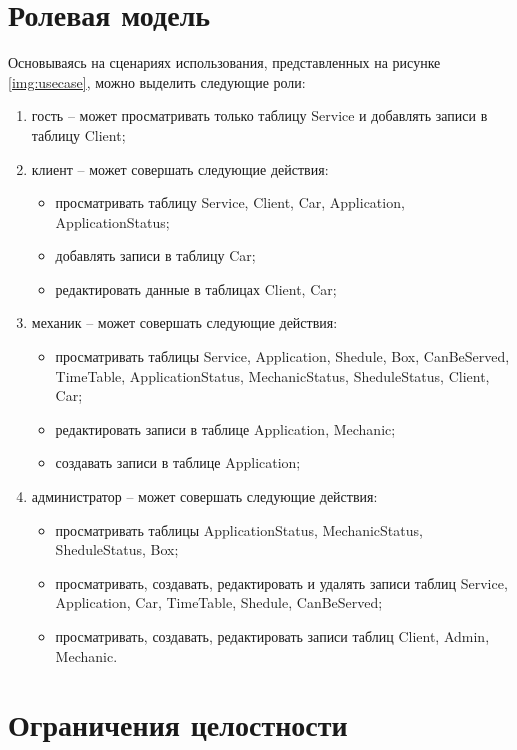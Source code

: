 \section{Ролевая модель}

Основываясь на сценариях использования, представленных на рисунке \ref{img:usecase}, можно выделить следующие роли:

\begin{enumerate}
	\item гость -- может просматривать только таблицу Service и добавлять записи в таблицу Client;
	\item клиент -- может совершать следующие действия:
	\begin{itemize}
		\item просматривать таблицу Service, Client, Car, Application, ApplicationStatus; 
		\item добавлять записи в таблицу Car;
		\item редактировать данные в таблицах Client, Car;
	\end{itemize}
	\item механик -- может совершать следующие действия:
		\begin{itemize}
		\item просматривать таблицы Service, Application, Shedule, Box, CanBeServed, TimeTable, ApplicationStatus, MechanicStatus, SheduleStatus, Client, Car; 
		\item редактировать записи в таблице Application, Mechanic;
		\item создавать записи в таблице Application;
	\end{itemize}
		\item администратор -- может совершать следующие действия:
	\begin{itemize}
		\item просматривать таблицы ApplicationStatus, MechanicStatus, SheduleStatus, Box;
		\item просматривать, создавать, редактировать и удалять записи таблиц Service, Application, Car, TimeTable, Shedule, CanBeServed;
		\item просматривать, создавать, редактировать записи таблиц Client, Admin, Mechanic.
	\end{itemize}
\end{enumerate}

\section{Ограничения целостности}

